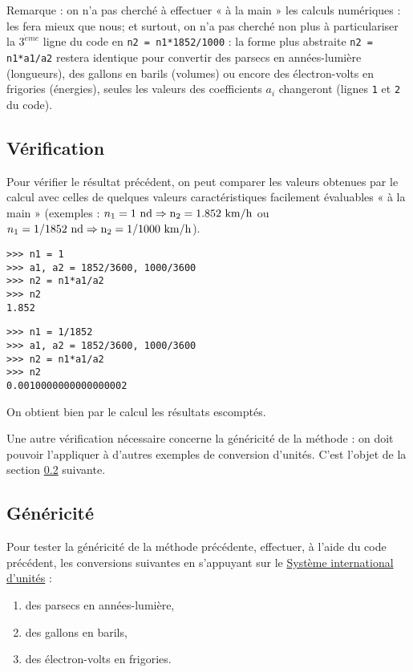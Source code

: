 Remarque : on n'a pas cherché à effectuer « à la main » les calculs numériques :
\python{} les fera mieux que nous; et surtout, on n'a pas cherché non plus à 
particulariser la $3^{\grave eme}$ ligne du code en \texttt{n2 = n1*1852/1000} :
la forme plus abstraite \texttt{n2 = n1*a1/a2} restera identique pour convertir 
des parsecs en années-lumière (longueurs), des gallons en barils (volumes) ou 
encore des électron-volts en frigories (énergies), seules les valeurs des coefficients $a_i$ changeront (lignes \texttt{1} 
et \texttt{2} du code).

\subsection{Vérification}\label{affectation:physique:verification}
Pour vérifier le résultat précédent, on peut comparer les valeurs obtenues par le calcul 
avec celles de quelques valeurs caractéristiques facilement évaluables « à la main »
(exemples : $n_1 = 1\ \rm{nd} \Rightarrow{} n_2 = 1.852\ \rm{km/h}$ ou
$n_1 = 1/1852\ \rm{nd} \Rightarrow{} n_2 = 1/1000\ \rm{km/h}$).

\begin{minipage}[t]{7.5cm}\footnotesize
\begin{Verbatim}
>>> n1 = 1
>>> a1, a2 = 1852/3600, 1000/3600
>>> n2 = n1*a1/a2
>>> n2
1.852
\end{Verbatim}
\end{minipage}
\hfill
\begin{minipage}[t]{7.5cm}\footnotesize
\begin{Verbatim}
>>> n1 = 1/1852
>>> a1, a2 = 1852/3600, 1000/3600
>>> n2 = n1*a1/a2
>>> n2
0.0010000000000000002
\end{Verbatim}
\end{minipage}
\vspace*{2mm}

\noindent On obtient bien par le calcul les résultats escomptés.

Une autre vérification nécessaire concerne la généricité de la méthode : 
on doit pouvoir l'appliquer à d'autres exemples de conversion d'unités.
C'est l'objet de la section \ref{affectation:physique:genericite} suivante.

\subsection{Généricité}\label{affectation:physique:genericite}
Pour tester la généricité de la méthode précédente, 
effectuer, à l'aide du code \python{} précédent, les conversions suivantes 
en s'appuyant sur le \href{http://www.bipm.org/fr/si/}{Système international d'unités} :
\begin{enumerate}
\item des parsecs en années-lumière,
\item des gallons en barils,
\item des électron-volts en frigories.
\end{enumerate}

